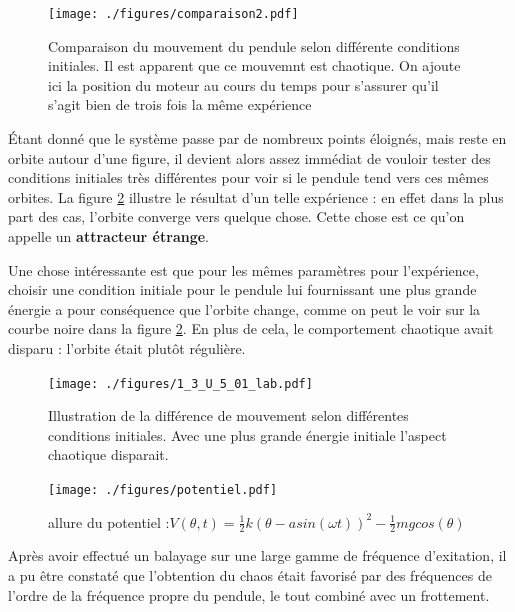 \documentclass[a4paper,12pt,oneside]{article}
\begin{document}
\begin{figure}[h!]
  \begin{center}
  \texttt{[image: ./figures/comparaison2.pdf]}
  \caption{Comparaison du mouvement du pendule selon différente conditions initiales. Il est apparent que ce mouvemnt est chaotique. On ajoute ici la position du moteur au cours du temps pour s'assurer qu'il s'agit bien de trois fois la même expérience} \label{fig:comparaison2}
  \end{center}
\end{figure}

Étant donné que le système passe par de nombreux points éloignés, mais reste en orbite autour d'une figure, il devient alors assez immédiat de vouloir tester des conditions initiales très différentes pour voir si le pendule tend vers ces mêmes orbites. La figure \ref{fig:1_3_U_5_01_lab} illustre le résultat d'un telle expérience : en effet dans la plus part des cas, l'orbite converge vers quelque chose. Cette chose est ce qu'on appelle un \textbf{attracteur étrange}.

Une chose intéressante est que pour les mêmes paramètres pour l'expérience, choisir une condition initiale pour le pendule lui fournissant une plus grande énergie a pour conséquence que l'orbite change, comme on peut le voir sur la courbe noire dans la figure \ref{fig:1_3_U_5_01_lab}. En plus de cela, le comportement chaotique avait disparu : l'orbite était plutôt régulière.

\begin{figure}[h!]
  \begin{center}
  \texttt{[image: ./figures/1\_3\_U\_5\_01\_lab.pdf]}
  \caption{Illustration de la différence de mouvement selon différentes conditions initiales. Avec une plus grande énergie initiale l'aspect chaotique disparait.} \label{fig:1_3_U_5_01_lab}
  \end{center}
\end{figure}

\begin{figure}[h!]
  \begin{center}
  \texttt{[image: ./figures/potentiel.pdf]}
  \caption{allure du potentiel :$V(\theta,t)=\frac{1}{2}k(\theta-a sin(\omega t))^2-\frac{1}{2} m g cos(\theta)$} \label{fig:potentiel}
  \end{center}
\end{figure}



Après avoir effectué un balayage sur une large gamme de fréquence d'exitation, il a pu être constaté que l'obtention du chaos était favorisé par des fréquences de l'ordre de la fréquence propre du pendule, le tout combiné avec un frottement.
\end{document}
